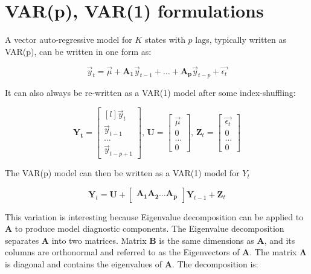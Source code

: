 \section{VAR(p), VAR(1) formulations}
A vector auto-regressive model for $K$ states with $p$ lags, typically written as VAR(p),
can be written in one form as:

\begin{equation}
\vec{y}_t = \vec{\mu} + \mathbf{A_1}\vec{y}_{t-1} + \ldots +
\mathbf{A_p}\vec{y}_{t-p} + \vec{\epsilon_t}
\end{equation}

It can also always be re-written as a VAR(1) model after some
index-shuffling:

\begin{equation}
\mathbf{Y_t} = \begin{bmatrix*}[l]
\vec{y}_t \\ \vec{y}_{t-1} \\ \ldots \\ \vec{y}_{t-p+1}
\end{bmatrix*}
\text{, }
\mathbf{U} = \begin{bmatrix}
\vec{\mu} \\ 0 \\ \ldots \\ 0 
\end{bmatrix}
\text{, }
\mathbf{Z}_t = \begin{bmatrix}
\vec{\epsilon_t} \\ 0 \\ \ldots \\ 0 
\end{bmatrix}
\end{equation}

The VAR(p) model can then be written as a VAR(1) model for $Y_t$

\begin{equation}
\mathbf{Y}_t = \mathbf{U} + \begin{bmatrix}
  \mathbf{A_1} \mathbf{A_2} \ldots \mathbf{A_p} 
\end{bmatrix} \mathbf{Y}_{t-1} + \mathbf{Z}_t
\end{equation}

This variation is interesting because Eigenvalue decomposition can be
applied to $\mathbf{A}$ to produce model diagnostic components.  The
Eigenvalue decomposition separates $\mathbf{A}$ into two matrices.
Matrix $\mathbf{B}$ is the same dimensions as $\mathbf{A}$, and its
columns are orthonormal and referred to as the Eigenvectors of
$\mathbf{A}$.  The matrix $\mathbf{\Lambda}$ is diagonal and
contains the eigenvalues of $\mathbf{A}$. The decomposition is:

